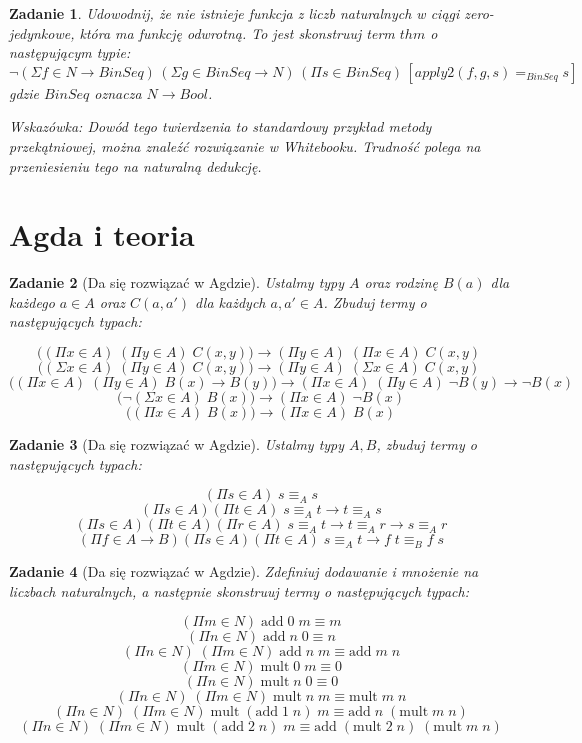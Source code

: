 \documentclass[11pt, a4paper]{article}
\newtheorem{zadanie}{Zadanie}
\begin{document}
\begin{zadanie}
 Udowodnij, że nie istnieje funkcja z liczb naturalnych w ciągi zero-jedynkowe, która ma funkcję odwrotną.
To jest skonstruuj
 term $thm$ o następującym typie:
\[
 \neg (\Sigma f \in N \to BinSeq)\, (\Sigma g \in BinSeq \to N)\,
(\Pi s \in BinSeq)\,[ apply2(f, g, s) =_{BinSeq} s ]
\]
gdzie $BinSeq$ oznacza $N \to Bool$.

Wskazówka: Dowód tego twierdzenia to standardowy przykład metody przekątniowej, można znaleźć rozwiązanie w Whitebooku.
Trudność polega na przeniesieniu tego na naturalną dedukcję.

\end{zadanie}

\section{Agda i teoria}


\begin{zadanie}[Da się rozwiązać w Agdzie]
Ustalmy typy $A$ oraz rodzinę $B(a)$ dla każdego $a \in A$ oraz $C(a, a')$ dla każdych $a, a' \in A$.
Zbuduj termy o następujących typach:

\[
 \big( (\Pi x \in A)\;(\Pi y \in A)\; C(x, y) \big) \to (\Pi y \in A)\;(\Pi x \in A)\; C(x, y)\;
\]
\[
 \big( (\Sigma x \in A)\;(\Pi y \in A)\; C(x, y) \big) \to (\Pi y \in A)\;(\Sigma x \in A)\; C(x, y)\;
\]
\[
 \big( (\Pi x \in A)\;(\Pi y \in A)\;B(x) \to B(y)\big) \to (\Pi x \in A)\;(\Pi y \in A)\;\neg B(y) \to \neg B(x)
\]
\[
 \big( \neg (\Sigma x \in A)\;B(x)\big) \to (\Pi x \in A)\;\neg B(x)
\]
\[
 \big( (\Pi x \in A)\;B(x)\big) \to (\Pi x \in A)\;B(x)
\]
\end{zadanie}


\begin{zadanie}[Da się rozwiązać w Agdzie]
Ustalmy typy $A, B$, zbuduj termy o następujących typach:

\[
 (\Pi s \in A)\; s \equiv_A s
\]
\[
  (\Pi s \in A)(\Pi t \in A)\; s \equiv_A t \to t \equiv_A s
\]
\[
  (\Pi s \in A)(\Pi t \in A)(\Pi r \in A)\; s \equiv_A t \to t \equiv_A r \to s \equiv_A r
\]
\[
  (\Pi f \in A \to B)(\Pi s \in A)(\Pi t \in A)\; s \equiv_A t \to f\;t \equiv_B f\;s
\]

\end{zadanie}

\begin{zadanie}[Da się rozwiązać w Agdzie]
Zdefiniuj dodawanie i mnożenie na liczbach naturalnych, a następnie skonstruuj termy o następujących typach:

\[
 (\Pi m \in N)\;\mbox{add}\;0\;m \equiv m
\]
\[
 (\Pi n \in N)\;\mbox{add}\;n\;0 \equiv n
\]
\[
 (\Pi n \in N)\;(\Pi m \in N)\;\mbox{add}\;n\;m \equiv \mbox{add}\;m\;n
\]
\[
 (\Pi m \in N)\;\mbox{mult}\;0\;m \equiv 0
\]
\[
 (\Pi n \in N)\;\mbox{mult}\;n\;0 \equiv 0
\]
\[
 (\Pi n \in N)\;(\Pi m \in N)\;\mbox{mult}\;n\;m \equiv \mbox{mult}\;m\;n
\]
\[
 (\Pi n \in N)\;(\Pi m \in N)\;\mbox{mult}\;(\mbox{add}\;1\;n)\;m \equiv \mbox{add}\;n\;(\mbox{mult}\;m\;n)
\]
\[
 (\Pi n \in N)\;(\Pi m \in N)\;\mbox{mult}\;(\mbox{add}\;2\;n)\;m \equiv \mbox{add}\;(\mbox{mult}\; 2\; n)\;(\mbox{mult}\;m\;n)
\]

\end{zadanie}
\end{document}
